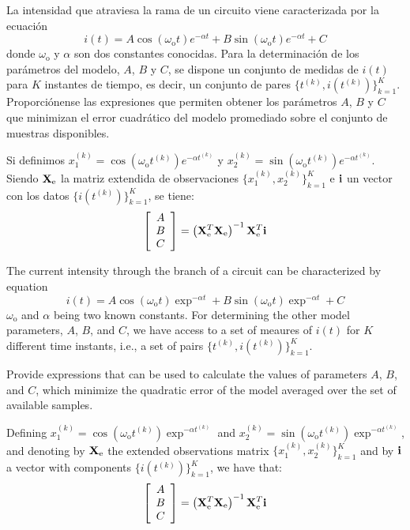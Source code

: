 \ifspanish

\question La intensidad que atraviesa la rama de un circuito viene caracterizada por la ecuación
$$i(t) = A \cos(\omega_\text{o}t) {e^{-\alpha t}} + B \sin(\omega_\text{o}t) {e^{-\alpha t}} + C $$
donde $\omega_\text{o}$ y $\alpha$ son dos constantes conocidas.  Para la determinación de los parámetros del modelo, $A$, $B$ y $C$, se dispone un conjunto de medidas
de $i(t)$ para $K$ instantes de tiempo, es decir, un conjunto de pares $\{t^{(k)}, i(t^{(k)})\}_{k=1}^K$.    
Proporciónense las expresiones que permiten obtener los parámetros $A$, $B$ y $C$ que minimizan el error cuadrático del modelo promediado sobre el conjunto de muestras disponibles.

\begin{solution}
Si definimos $x_1^{(k)} = \cos(\omega_\text{o} t^{(k)}) {e^{-\alpha t^{(k)}}}$ y  $x_2^{(k)} = \sin(\omega_\text{o} t^{(k)}) {e^{-\alpha t^{(k)}}}$. Siendo ${\bf X}_\text{e}$  la matriz
extendida de observaciones $\{x_1^{(k)},x_2^{(k)}\}_{k=1}^K$ e $\bf i$ un vector con los datos $\{i(t^{(k)})\}_{k=1}^K$, se tiene:
$$ \left[ \begin{array}{c} A \\ B \\ C \end{array}\right] = \left( {\bf X}_\text{e}^T {\bf X}_\text{e}\right)^{-1} {\bf X}_\text{e}^T {\bf i}$$ 
\end{solution}

\else

\question The current intensity through the branch of a circuit can be characterized by equation
$$i(t) = A \cos(\omega_\text{o}t) \exp^{-\alpha t} + B \sin(\omega_\text{o}t) \exp^{-\alpha t} + C $$
$\omega_\text{o}$ and $\alpha$ being two known constants.  For determining the other model parameters, $A$, $B$, and $C$, we have access to a set of meaures of $i(t)$ for $K$ different time instants, i.e., a set of pairs $\{t^{(k)}, i(t^{(k)})\}_{k=1}^K$.    

Provide expressions that can be used to calculate the values of parameters $A$, $B$, and $C$, which minimize the quadratic error of the model averaged over the set of available samples.

\begin{solution}
Defining $x_1^{(k)} = \cos(\omega_\text{o} t^{(k)}) \exp^{-\alpha t^{(k)}}$ and $x_2^{(k)} = \sin(\omega_\text{o} t^{(k)}) \exp^{-\alpha t^{(k)}}$, and denoting by ${\bf X}_\text{e}$ the extended observations matrix $\{x_1^{(k)},x_2^{(k)}\}_{k=1}^K$ and by $\bf i$ a vector with components $\{i(t^{(k)})\}_{k=1}^K$, we have that:
$$ \left[ \begin{array}{c} A \\ B \\ C \end{array}\right] = \left( {\bf X}_\text{e}^T {\bf X}_\text{e}\right)^{-1} {\bf X}_\text{e}^T {\bf i}$$ 
\end{solution}

\fi